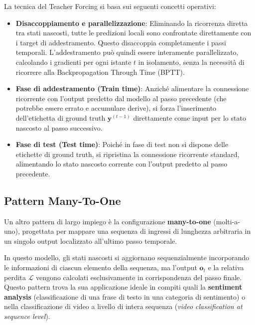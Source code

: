 ﻿\documentclass[11pt, a4paper]{article}
\begin{document}
La tecnica del Teacher Forcing si basa sui seguenti concetti operativi:
\begin{itemize}
    \item \textbf{Disaccoppiamento e parallelizzazione}: Eliminando la ricorrenza diretta tra stati nascosti, tutte le predizioni locali sono confrontate direttamente con i target di addestramento. Questo disaccoppia completamente i passi temporali. L'addestramento può quindi essere interamente parallelizzato, calcolando i gradienti per ogni istante $t$ in isolamento, senza la necessità di ricorrere alla Backpropagation Through Time (BPTT).
    \item \textbf{Fase di addestramento (Train time)}: Anziché alimentare la connessione ricorrente con l'output predetto dal modello al passo precedente (che potrebbe essere errato e accumulare derive), si forza l'inserimento dell'etichetta di ground truth $\bm{y}^{(t-1)}$ direttamente come input per lo stato nascosto al passo successivo.
    \item \textbf{Fase di test (Test time)}: Poiché in fase di test non si dispone delle etichette di ground truth, si ripristina la connessione ricorrente standard, alimentando lo stato nascosto corrente con l'output predetto al passo precedente.
\end{itemize}

\subsection{Pattern Many-To-One}

Un altro pattern di largo impiego è la configurazione \textbf{many-to-one} (molti-a-uno), progettata per mappare una sequenza di ingressi di lunghezza arbitraria in un singolo output localizzato all'ultimo passo temporale.


In questo modello, gli stati nascosti si aggiornano sequenzialmente incorporando le informazioni di ciascun elemento della sequenza, ma l'output $\bm{o}_t$ e la relativa perdita $\mathcal{L}$ vengono calcolati esclusivamente in corrispondenza del passo finale. Questo pattern trova la sua applicazione ideale in compiti quali la \textbf{sentiment analysis} (classificazione di una frase di testo in una categoria di sentimento) o nella classificazione di video a livello di intera sequenza (\emph{video classification at sequence level}).
\end{document}
